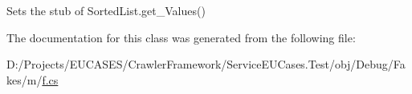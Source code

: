 Sets the stub of Sorted\-List.\-get\-\_\-\-Values()



The documentation for this class was generated from the following file\-:\begin{DoxyCompactItemize}
\item 
D\-:/\-Projects/\-E\-U\-C\-A\-S\-E\-S/\-Crawler\-Framework/\-Service\-E\-U\-Cases.\-Test/obj/\-Debug/\-Fakes/m/\hyperlink{m_2f_8cs}{f.\-cs}\end{DoxyCompactItemize}
